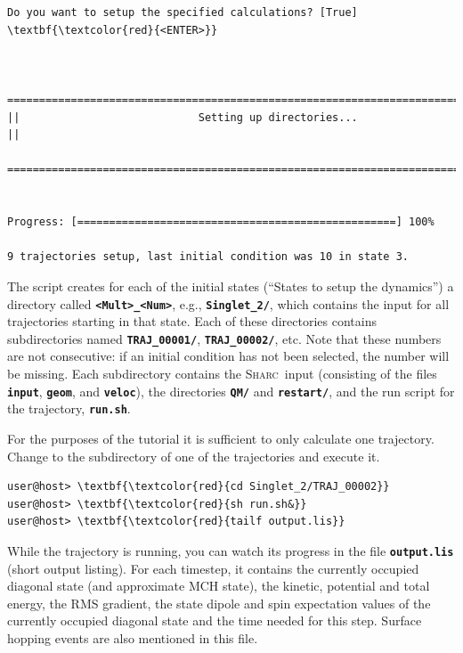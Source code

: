 \documentclass[a4paper,11pt,DIV=15,openany]{scrbook}
\newcommand{\sharc}{\textsc{Sharc}}
\newcommand{\ttt}[1]{\textbf{\texttt{#1}}}
\begin{document}
\begin{oframed}
\begin{Verbatim}[commandchars=\\\{\}]
Do you want to setup the specified calculations? [True] \textbf{\textcolor{red}{<ENTER>}}


  ================================================================================
||                            Setting up directories...                           ||
  ================================================================================


Progress: [==================================================] 100%

9 trajectories setup, last initial condition was 10 in state 3.
\end{Verbatim}
\end{oframed}

\normalsize

The script creates for each of the initial states (``States to setup the dynamics'') a directory called \ttt{<Mult>\_<Num>}, e.g., \ttt{Singlet\_2/}, which contains the input for all trajectories starting in that state. 
Each of these directories contains subdirectories named \ttt{TRAJ\_00001/}, \ttt{TRAJ\_00002/}, etc. 
Note that these numbers are not consecutive: if an initial condition has not been selected, the number will be missing.
Each subdirectory contains the \sharc\ input (consisting of the files \ttt{input}, \ttt{geom}, and \ttt{veloc}), the directories \ttt{QM/} and \ttt{restart/}, and the run script for the trajectory, \ttt{run.sh}.

For the purposes of the tutorial it is sufficient to only calculate one trajectory. Change to the subdirectory of one of the trajectories and execute it.
\begin{Verbatim}[commandchars=\\\{\}]
user@host> \textbf{\textcolor{red}{cd Singlet_2/TRAJ_00002}}
user@host> \textbf{\textcolor{red}{sh run.sh&}}
user@host> \textbf{\textcolor{red}{tailf output.lis}}
\end{Verbatim}
While the trajectory is running, you can watch its progress in the file \ttt{output.lis} (short output listing). For each timestep, it contains the currently occupied diagonal state (and approximate MCH state), the kinetic, potential and total energy, the RMS gradient, the state dipole and spin expectation values of the currently occupied diagonal state and the time needed for this step. Surface hopping events are also mentioned in this file.
\end{document}

